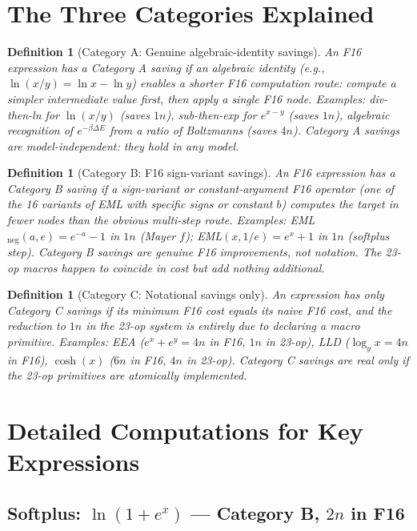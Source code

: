 \documentclass[11pt]{article}
\newtheorem{definition}[theorem]{Definition}
\begin{document}
\section{The Three Categories Explained}

\begin{definition}[Category A: Genuine algebraic-identity savings]
An F16 expression has a \emph{Category A saving} if an algebraic identity (e.g., $\ln(x/y)=\ln x-\ln y$)
enables a shorter F16 computation route: compute a simpler intermediate value first,
then apply a single F16 node.
Examples: div-then-ln for $\ln(x/y)$ (saves $1n$), sub-then-exp for $e^{x-y}$ (saves $1n$),
algebraic recognition of $e^{-\beta\Delta E}$ from a ratio of Boltzmanns (saves $4n$).
Category A savings are model-independent: they hold in any model.
\end{definition}

\begin{definition}[Category B: F16 sign-variant savings]
An F16 expression has a \emph{Category B saving} if a sign-variant or constant-argument
F16 operator (one of the 16 variants of EML with specific signs or constant $b$)
computes the target in fewer nodes than the obvious multi-step route.
Examples: EML$_{\mathrm{neg}}(a,e)=e^{-a}-1$ in $1n$ (Mayer $f$);
EML$(x,1/e)=e^x+1$ in $1n$ (softplus step).
Category B savings are genuine F16 improvements, not notation.
The 23-op macros happen to coincide in cost but add nothing additional.
\end{definition}

\begin{definition}[Category C: Notational savings only]
An expression has only \emph{Category C savings} if its minimum F16 cost equals
its naive F16 cost, and the reduction to $1n$ in the 23-op system is entirely due to
declaring a macro primitive.
Examples: EEA ($e^x+e^y=4n$ in F16, $1n$ in 23-op), LLD ($\log_y x=4n$ in F16),
$\cosh(x)$ ($6n$ in F16, $4n$ in 23-op).
Category C savings are real only if the 23-op primitives are atomically implemented.
\end{definition}

\section{Detailed Computations for Key Expressions}

\subsection{Softplus: $\ln(1+e^x)$ — Category B, $2n$ in F16}
\end{document}
